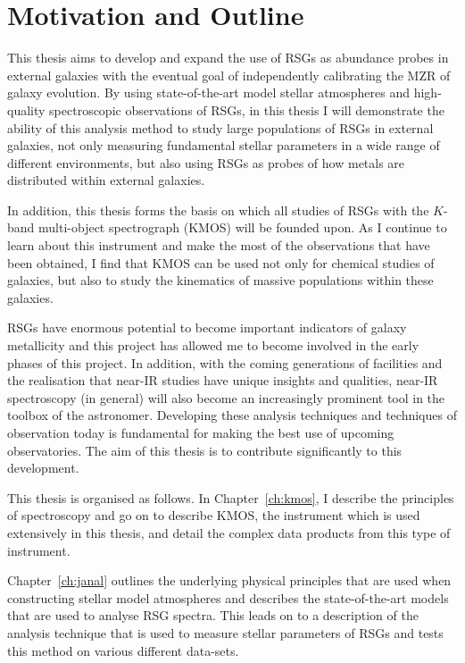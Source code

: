 

\section{Motivation and Outline} %
\label{sec:motivation_and_outline}

This thesis aims to develop and expand the use of RSGs as abundance probes in external galaxies with the eventual goal of independently calibrating the MZR of galaxy evolution.
By using state-of-the-art model stellar atmospheres and high-quality spectroscopic observations of RSGs, in this thesis I will demonstrate the ability of this analysis method to study large populations of RSGs in external galaxies, not only measuring fundamental stellar parameters in a wide range of different environments, but also using RSGs as probes of how metals are distributed within external galaxies.

In addition, this thesis forms the basis on which all studies of RSGs with the $K$-band multi-object spectrograph (KMOS) will be founded upon.
As I continue to learn about this instrument and make the most of the observations that have been obtained, I find that KMOS can be used not only for chemical studies of galaxies, but also to study the kinematics of massive populations within these galaxies.

RSGs have enormous potential to become important indicators of galaxy metallicity and this project has allowed me to become involved in the early phases of this project.
In addition, with the coming generations of facilities and the realisation that near-IR studies have unique insights and qualities, near-IR spectroscopy (in general) will also become an increasingly prominent tool in the toolbox of the astronomer.
Developing these analysis techniques and techniques of observation today is fundamental for making the best use of upcoming observatories.
The aim of this thesis is to contribute significantly to this development.

This thesis is organised as follows.
In Chapter~\ref{ch:kmos}, I describe the principles of spectroscopy and go on to describe KMOS, the instrument which is used extensively in this thesis, and detail the complex data products from this type of instrument.

Chapter~\ref{ch:janal} outlines the underlying physical principles that are used when constructing stellar model atmospheres and describes the state-of-the-art models that are used to analyse RSG spectra.
This leads on to a description of the analysis technique that is used to measure stellar parameters of RSGs and tests this method on various different data-sets.

